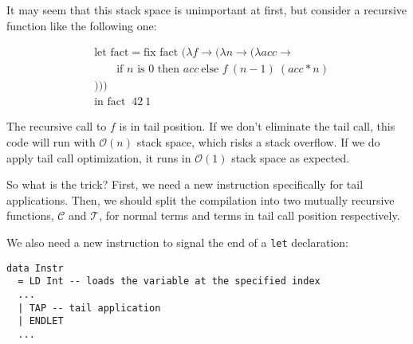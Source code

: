 It may seem that this stack space is unimportant at first, but consider a recursive function
like the following one:

\[
\begin{aligned}
  &\text{let fact} = \text{fix fact } (\lambda f \to (\lambda n \to (\lambda acc \to\\[1mm]
                 &\quad\quad \text{if } n \text{ is 0 then } acc \ \text{else } f \ (n - 1) \ (acc * n)\\[1mm]
                 &)))\\[1mm]
                 &\text{in fact }\ 42\ 1
\end{aligned}
\]

The recursive call to $ f $ is in tail position. If we don't eliminate the tail call,
this code will run with $\mathcal{O}(n)$ stack space, which risks a stack overflow. If we
do apply tail call optimization, it runs in $\mathcal{O}(1)$ stack space as expected.

So what is the trick? First, we need a new instruction specifically for tail applications.
Then, we should split the compilation into two mutually recursive functions, $\mathcal{C}$ and $\mathcal{T}$, for normal terms
and terms in tail call position respectively.

We also need a new instruction to signal the end of a \texttt{let} declaration:

\begin{lstlisting}
data Instr
  = LD Int -- loads the variable at the specified index 
  ...
  | TAP -- tail application
  | ENDLET
  ...
\end{lstlisting}

